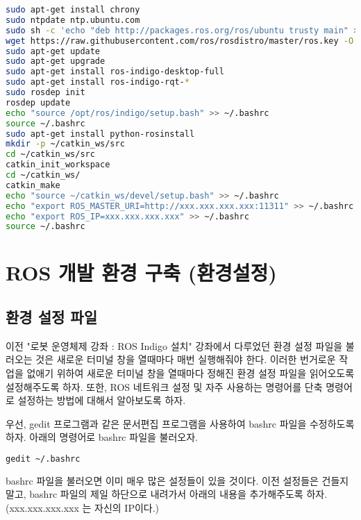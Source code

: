 \begin{lstlisting}[language=bash]
sudo apt-get install chrony
sudo ntpdate ntp.ubuntu.com
sudo sh -c 'echo "deb http://packages.ros.org/ros/ubuntu trusty main" > /etc/apt/sources.list.d/ros-latest.list'
wget https://raw.githubusercontent.com/ros/rosdistro/master/ros.key -O - | sudo apt-key add -
sudo apt-get update
sudo apt-get upgrade
sudo apt-get install ros-indigo-desktop-full
sudo apt-get install ros-indigo-rqt-*
sudo rosdep init
rosdep update
echo "source /opt/ros/indigo/setup.bash" >> ~/.bashrc
source ~/.bashrc
sudo apt-get install python-rosinstall
mkdir -p ~/catkin_ws/src
cd ~/catkin_ws/src
catkin_init_workspace
cd ~/catkin_ws/
catkin_make
echo "source ~/catkin_ws/devel/setup.bash" >> ~/.bashrc
echo "export ROS_MASTER_URI=http://xxx.xxx.xxx.xxx:11311" >> ~/.bashrc
echo "export ROS_IP=xxx.xxx.xxx.xxx" >> ~/.bashrc
source ~/.bashrc
\end{lstlisting}

\section{ROS 개발 환경 구축 (환경설정)}

\subsection{환경 설정 파일}

이전 "로봇 운영체제 강좌 : ROS Indigo 설치" 강좌에서 다루었던 환경 설정 파일을 불러오는 것은 새로운 터미널 창을 열때마다 매번 실행해줘야 한다. 이러한 번거로운 작업을 없애기 위하여 새로운 터미널 창을 열때마다 정해진 환경 설정 파일을 읽어오도록 설정해주도록 하자. 또한, ROS 네트워크 설정 및 자주 사용하는 명령어를 단축 명령어로 설정하는 방법에 대해서 알아보도록 하자.

우선, gedit 프로그램과 같은 문서편집 프로그램을 사용하여 bashrc 파일을 수정하도록 하자. 아래의 명령어로 bashrc 파일을 불러오자.

\begin{lstlisting}[language=bash]
gedit ~/.bashrc
\end{lstlisting}

\noindent
bashrc 파일을 불러오면 이미 매우 많은 설정들이 있을 것이다. 이전 설정들은 건들지 말고, bashrc 파일의 제일 하단으로 내려가서 아래의 내용을 추가해주도록 하자. (xxx.xxx.xxx.xxx 는 자신의 IP이다.)

